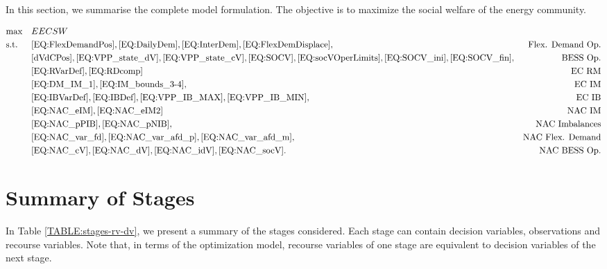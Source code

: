 \documentclass{article}
\begin{document}
In this section, we summarise the complete model formulation. The objective is to maximize the social welfare of the energy community.

\begin{align*}
\notag & \text{max} & & EECSW \\
\notag & \text{s.t.} & & \eqref{EQ:FlexDemandPos}, \eqref{EQ:DailyDem}, \eqref{EQ:InterDem}, \eqref{EQ:FlexDemDisplace},  & \text{Flex. Demand Op.} \\
\notag & & & \eqref{dVdCPos}, \eqref{EQ:VPP_state_dV}, \eqref{EQ:VPP_state_cV}, \eqref{EQ:SOCV}, \eqref{EQ:socVOperLimits}, \eqref{EQ:SOCV_ini}, \eqref{EQ:SOCV_fin}, & \text{BESS Op.} \\
\notag & & & \eqref{EQ:RVarDef}, \eqref{EQ:RDcomp}  & \text{EC RM} \\
\notag & & & \eqref{EQ:DM_IM_1}, \eqref{EQ:IM_bounds_3-4}, & \text{EC IM} \\
\notag & & & \eqref{EQ:IBVarDef}, \eqref{EQ:IBDef}, \eqref{EQ:VPP_IB_MAX}, \eqref{EQ:VPP_IB_MIN}, & \text{EC IB} \\
\notag & & & \eqref{EQ:NAC_eIM}, \eqref{EQ:NAC_eIM2} & \text{NAC IM} \\
\notag & & & \eqref{EQ:NAC_pPIB}, \eqref{EQ:NAC_pNIB}, & \text{NAC Imbalances} \\
\notag & & & \eqref{EQ:NAC_var_fd}, \eqref{EQ:NAC_var_afd_p}, \eqref{EQ:NAC_var_afd_m}, & \text{NAC Flex. Demand} \\
\notag & & & \eqref{EQ:NAC_cV}, \eqref{EQ:NAC_dV}, \eqref{EQ:NAC_idV}, \eqref{EQ:NAC_socV}. & \text{NAC BESS Op.} \\
\end{align*}

\section{Summary of Stages}

In Table \ref{TABLE:stages-rv-dv}, we present a summary of the stages considered. Each stage can contain decision variables, observations and recourse variables. Note that, in terms of the optimization model, recourse variables of one stage are equivalent to decision variables of the next stage.
\end{document}
